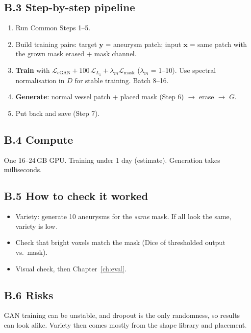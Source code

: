 \documentclass[11pt,a4paper,oneside]{report}
\newcommand{\Loss}{\mathcal{L}}
\begin{document}
\subsection*{B.3 Step-by-step pipeline}
\begin{enumerate}
  \item Run Common Steps 1--5.
  \item Build training pairs: target $\bm y$ = aneurysm patch; input $\bm x$ = same patch with the grown mask erased + mask channel.
  \item \textbf{Train} with $\Loss_{\text{cGAN}} + 100\,\Loss_{L_1} + \lambda_m\Loss_{\text{mask}}$ ($\lambda_m$ = 1--10). Use spectral normalisation in $D$ for stable training. Batch 8--16.
  \item \textbf{Generate}: normal vessel patch + placed mask (Step 6) $\rightarrow$ erase $\rightarrow$ $G$.
  \item Put back and save (Step 7).
\end{enumerate}

\subsection*{B.4 Compute}
One 16--24\,GB GPU. Training under 1 day (estimate). Generation takes milliseconds.

\subsection*{B.5 How to check it worked}
\begin{itemize}
  \item Variety: generate 10 aneurysms for the \emph{same} mask. If all look the same, variety is low.
  \item Check that bright voxels match the mask (Dice of thresholded output vs.\ mask).
  \item Visual check, then Chapter~\ref{ch:eval}.
\end{itemize}

\subsection*{B.6 Risks}
\begin{caution}
GAN training can be unstable, and dropout is the only randomness, so results can look alike. Variety then comes mostly from the shape library and placement.
\end{caution}
\end{document}
